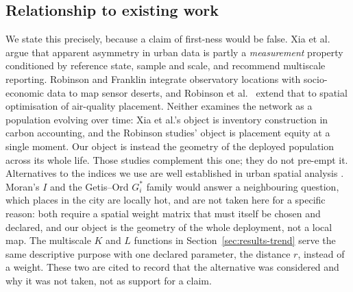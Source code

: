 \documentclass{article}
\begin{document}
\subsection{Relationship to existing work}
\label{sec:prior}

We state this precisely, because a claim of first-ness would be false. Xia et
al.~\cite{xia2026measurement} argue that apparent asymmetry in urban
data is partly a \emph{measurement} property conditioned by reference state, sample and
scale, and recommend multiscale reporting. Robinson and Franklin
\cite{robinson2021sensor} integrate observatory locations with socio-economic data to
map sensor deserts, and Robinson et al.~\cite{robinson2022optimizing} extend that to
spatial optimisation of air-quality placement. Neither examines the network as a
population evolving over time: Xia et al.'s object is inventory construction in carbon
accounting, and the Robinson studies' object is placement equity at a single moment. Our
object is
instead the geometry of the deployed population across its whole life. Those studies
complement this one; they do not pre-empt it. Alternatives to the indices we use are
well established in urban spatial analysis \cite{paez2004spatial}. Moran's $I$
\cite{moran1950notes} and the Getis--Ord $G_i^{*}$ family \cite{getis1992analysis} would
answer a neighbouring question, which places in the city are locally hot, and are not taken
here for a specific reason: both require a spatial weight matrix that must itself be
chosen and declared, and our object is the geometry of the whole deployment, not a
local map. The multiscale $K$ and $L$ functions in Section~\ref{sec:results-trend} serve
the same descriptive purpose with one declared parameter, the distance $r$, instead of a
weight. These two are cited to record that the alternative was considered and why it was
not taken, not as support for a claim.
\end{document}
